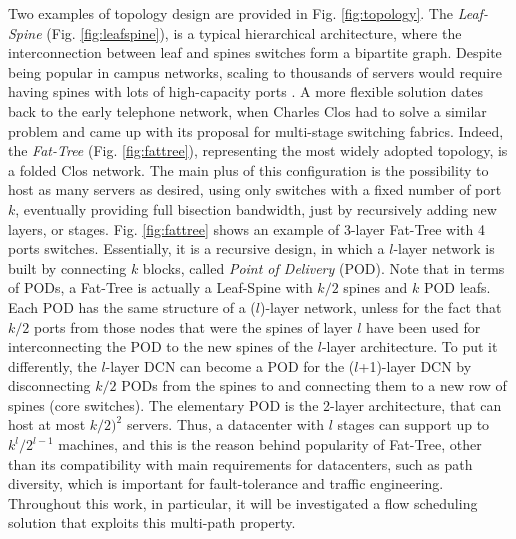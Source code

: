 Two examples of topology design are provided in Fig. \ref{fig:topology}.
The \textit{Leaf-Spine} (Fig. \ref{fig:leafspine}), is a typical hierarchical architecture, where the interconnection between leaf and spines switches form a bipartite graph. Despite being popular in campus networks, scaling to thousands of servers would require having spines with lots of high-capacity ports .  
%	
%	
%	
%	
A more flexible solution dates back to the early telephone network, when Charles Clos had to solve a similar problem and came up with its proposal for multi-stage switching fabrics. Indeed, the \textit{Fat-Tree} (Fig. \ref{fig:fattree}), representing the most widely adopted topology, is a folded Clos network. The main plus of this configuration is the possibility to host as many servers as desired, using only switches with a fixed number of port $k$, eventually providing full bisection bandwidth, just by recursively adding new layers, or stages. Fig. \ref{fig:fattree} shows an example of 3-layer Fat-Tree with 4 ports switches. Essentially, it is a recursive design, in which a $l$-layer network is built by connecting $k$ blocks, called \textit{Point of Delivery} (POD). Note that in terms of PODs, a Fat-Tree is actually a Leaf-Spine with $k/2$ spines and $k$ POD leafs. Each POD has the same structure of a ($l$)\nobreakdash-layer network, unless for the fact that $k/2$ ports from those nodes that were the spines of layer $l$ have been used for interconnecting the POD to the new spines of the $l$\nobreakdash-layer architecture. To put it differently, the $l$\nobreakdash-layer DCN can become a POD for the ($l$\nobreakdash+1)\nobreakdash-layer DCN by disconnecting $k/2$ PODs from the spines to and connecting them to a new row of spines (core switches). The elementary POD is the 2\nobreakdash-layer architecture, that can host at most $k/2)^2$ servers. Thus, a datacenter with $l$ stages can support up to $k^l/2^{l-1}$ machines, and this is the 
reason behind popularity of Fat-Tree, other than its compatibility with main requirements for datacenters, such as path diversity, which is important for fault-tolerance and traffic engineering. Throughout this work, in particular, it will be investigated a flow scheduling solution that exploits this multi-path property. 

